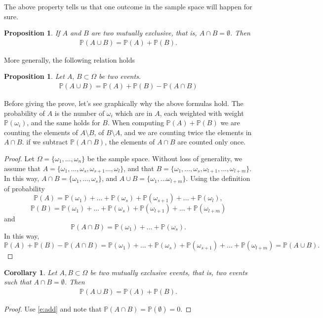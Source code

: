 \documentclass[12pt]{article}
\newtheorem{proposition}[theorem]{Proposition}
\newtheorem{corollary}[theorem]{Corollary}
\newcommand{\<}{{\langle \!\! \langle}}
\renewcommand{\>}{{\rangle \!\! \rangle}}
\newcommand{\bel}[2]{\begin{equation} \label{#1} \begin{split} #2
 					\end{split} \end{equation}}
\begin{document}
The above property tells us that one outcome in the sample space will happen for sure.
\begin{proposition}
If $A$ and $B$ are two \emph{mutually exclusive}, that is,  $A\cap B=\emptyset$. Then 
\bel{e:add}{
\mathbb{P}(A\cup B)=\mathbb{P}(A)+\mathbb{P}(B).}
\end{proposition}
More generally, the following relation holds
\begin{proposition}
Let $A,\, B\subset \Omega$ be two events. 
\bel{e:union}{\mathbb{P}(A\cup B)=\mathbb{P}(A)+\mathbb{P}(B)-\mathbb{P}(A\cap B)}
\end{proposition}
Before giving the  prove, let's see graphically why the above formulas hold. The probability of $A$ is the number of $\omega_i$ which are in $A$, each weighted with weight $\mathbb{P}(\omega_i)$,  and the same holds for $B$. When computing $\mathbb{P}(A) + \mathbb{P}(B)$ we are counting the elements of $A\setminus B$, of $B\setminus A$, and we are counting twice the elements in $ A \cap B$. if we subtract $\mathbb{P}(A\cap B)$, the elements of $A\cap B $ are counted only once.  

\begin{proof}
Let $\Omega=\{\omega_1,...,\omega_n\}$ be the sample space. Without loss of generality, we assume that $A=\{\omega_1,...,\omega_s,\omega_{s+1}...,\omega_l\}$, and that $B=\{\omega_1,...,\omega_s,\omega_{l+1},...,\omega_{l+m}\}$. In this way, $A\cap B=\{\omega_1,...,\omega_s\}$, and $A\cup B=\{\omega_1,...\omega_{l+m}\}$. Using the definition of probability 
$$\mathbb{P}(A)=\mathbb{P}(\omega_1)+...+\mathbb{P}(\omega_s)+\mathbb{P}(\omega_{s+1})+...+\mathbb{P}(\omega_l),$$
$$
\mathbb{P}(B)=\mathbb{P}(\omega_1)+...+\mathbb{P}(\omega_s)+\mathbb{P}(\omega_{l+1})+...+\mathbb{P}(\omega_{l+m})
$$
and 
$$\mathbb{P}(A\cap B)=\mathbb{P}(\omega_1)+...+\mathbb{P}(\omega_s).$$
In this way, $$\mathbb{P}(A)+\mathbb{P}(B)-\mathbb{P}(A\cap B)=\mathbb{P}(\omega_1)+...+\mathbb{P}(\omega_s)+\mathbb{P}(\omega_{s+1})+...+\mathbb{P}(\omega_{l+m})=\mathbb{P}(A\cup B).$$
\end{proof}

\begin{corollary}\label{}
	Let $A,B\subset\Omega$ be two mutually exclusive events, that is, two events such that $A\cap B = \emptyset$. Then 
	\bel{e:addc}{\mathbb{P}(A\cup B) = \mathbb{P}(A)+\mathbb{P}(B).}
\end{corollary}
\begin{proof}
	Use \eqref{e:add} and note that $\mathbb{P}(A\cap B)= \mathbb{P}(\emptyset)= 0$. 
\end{proof}
\end{document}
